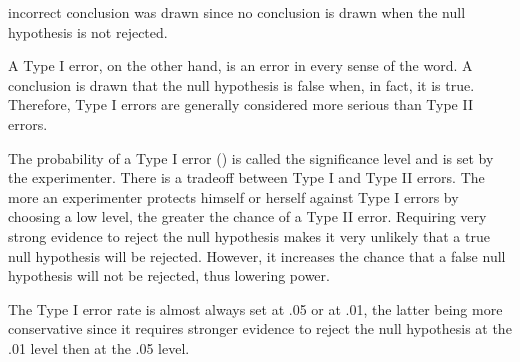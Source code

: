 incorrect conclusion was drawn since no conclusion is drawn when the null hypothesis is not rejected.


A Type I error, on the other hand, is an error in every sense of the word. A conclusion is drawn that the null hypothesis is false when, in fact, it is true. Therefore, Type I errors are generally considered more serious than Type II errors. 


The probability of a Type I error () is called the significance level and is set by the experimenter. There is a tradeoff between Type I and Type II errors. The more an experimenter protects himself or herself against Type I errors by choosing a low level, the greater the chance of a Type II error. Requiring very strong evidence to reject the null hypothesis makes it very unlikely that a true null hypothesis will be rejected. However, it increases the chance that a false null hypothesis will not be rejected, thus lowering power. 


The Type I error rate is almost always set at .05 or at .01, the latter being more conservative since it requires stronger evidence to reject the null hypothesis at the .01 level then at the .05 level. 

